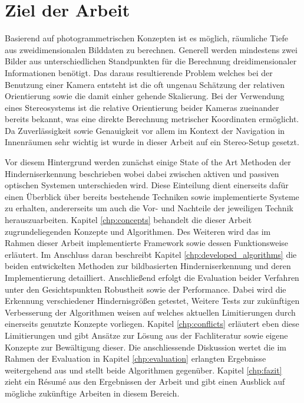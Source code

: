 \section{Ziel der Arbeit}
\label{sec:ziel_der_arbeit}
Basierend auf photogrammetrischen Konzepten ist es möglich, räumliche Tiefe aus zweidimensionalen Bilddaten zu berechnen. Generell werden mindestens zwei Bilder aus unterschiedlichen Standpunkten für die Berechnung dreidimensionaler Informationen benötigt. Das daraus resultierende Problem welches bei der Benutzung einer Kamera entsteht ist die oft ungenau Schätzung der relativen Orientierung sowie die damit einher gehende Skalierung. Bei der Verwendung eines Stereosystems ist die relative Orientierung beider Kameras zueinander bereits bekannt, was eine direkte Berechnung metrischer Koordinaten ermöglicht. Da Zuverlässigkeit sowie Genauigkeit vor allem im Kontext der Navigation in Innenräumen sehr wichtig ist wurde in dieser Arbeit auf ein Stereo-Setup gesetzt.


\noindent
Vor diesem Hintergrund werden zunächst einige State of the Art Methoden der Hinderniserkennung beschrieben wobei dabei zwischen aktiven und passiven optischen Systemen unterschieden wird. Diese Einteilung dient einerseits dafür einen Überblick über bereits bestehende Techniken sowie implementierte Systeme zu erhalten, andererseits um auch die Vor- und Nachteile der jeweiligen Technik herauszuarbeiten. Kapitel \ref{chp:concepts} behandelt die dieser Arbeit zugrundeliegenden Konzepte und Algorithmen. Des Weiteren wird das im Rahmen dieser Arbeit implementierte Framework sowie dessen Funktionsweise erläutert. Im Anschluss daran beschreibt Kapitel \ref{chp:developed_algorithms} die beiden entwickelten Methoden zur bildbasierten Hinderniserkennung und deren Implementierung detailliert. Anschließend erfolgt die Evaluation beider Verfahren unter den Gesichtspunkten Robustheit sowie der Performance. Dabei wird die Erkennung verschiedener Hindernisgrößen getestet, 
Weitere Tests zur zukünftigen Verbesserung der Algorithmen weisen auf welches aktuellen Limitierungen durch einerseits genutzte Konzepte vorliegen. Kapitel \ref{chp:conflicts} erläutert eben diese Limitierungen und gibt Ansätze zur Lösung aus der Fachliteratur sowie eigene Konzepte zur Bewältigung dieser. Die anschliessende Diskussion wertet die im Rahmen der Evaluation in Kapitel \ref{chp:evaluation} erlangten Ergebnisse weitergehend aus und stellt beide Algorithmen gegenüber. Kapitel \ref{chp:fazit} zieht ein Ré­su­mé aus den Ergebnissen der Arbeit und gibt einen Ausblick auf mögliche zukünftige Arbeiten in diesem Bereich.